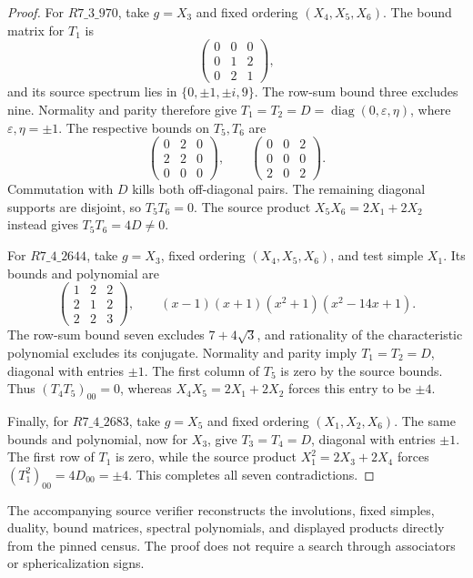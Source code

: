 \begin{proof}
For $R7\_3\_970$, take $g=X_3$ and fixed ordering
$(X_4,X_5,X_6)$. The bound matrix for $T_1$ is
\[
 \begin{pmatrix}0&0&0\\0&1&2\\0&2&1\end{pmatrix},
\]
and its source spectrum lies in $\{0,\pm1,\pm i,9\}$. The row-sum
bound three excludes nine. Normality and parity therefore give
$T_1=T_2=D=\operatorname{diag}(0,\varepsilon,\eta)$, where
$\varepsilon,\eta=\pm1$. The respective bounds on $T_5,T_6$ are
\[
 \begin{pmatrix}0&2&0\\2&2&0\\0&0&0\end{pmatrix},\qquad
 \begin{pmatrix}0&0&2\\0&0&0\\2&0&2\end{pmatrix}.
\]
Commutation with $D$ kills both off-diagonal pairs. The remaining
diagonal supports are disjoint, so $T_5T_6=0$. The source product
$X_5X_6=2X_1+2X_2$ instead gives $T_5T_6=4D\ne0$.

For $R7\_4\_2644$, take $g=X_3$, fixed ordering
$(X_4,X_5,X_6)$, and test simple $X_1$. Its bounds and polynomial are
\[
 \begin{pmatrix}1&2&2\\2&1&2\\2&2&3\end{pmatrix},\qquad
 (x-1)(x+1)(x^2+1)(x^2-14x+1).
\]
The row-sum bound seven excludes $7+4\sqrt3$, and rationality of the
characteristic polynomial excludes its conjugate. Normality and
parity imply $T_1=T_2=D$, diagonal with entries $\pm1$. The first
column of $T_5$ is zero by the source bounds. Thus $(T_4T_5)_{00}=0$,
whereas $X_4X_5=2X_1+2X_2$ forces this entry to be $\pm4$.

Finally, for $R7\_4\_2683$, take $g=X_5$ and fixed ordering
$(X_1,X_2,X_6)$. The same bounds and polynomial, now for $X_3$, give
$T_3=T_4=D$, diagonal with entries $\pm1$. The first row of $T_1$ is
zero, while the source product $X_1^2=2X_3+2X_4$ forces
$(T_1^2)_{00}=4D_{00}=\pm4$. This completes all seven contradictions.
\end{proof}

The accompanying source verifier reconstructs the involutions, fixed
simples, duality, bound matrices, spectral polynomials, and displayed
products directly from the pinned census. The proof does not require
a search through associators or sphericalization signs.
